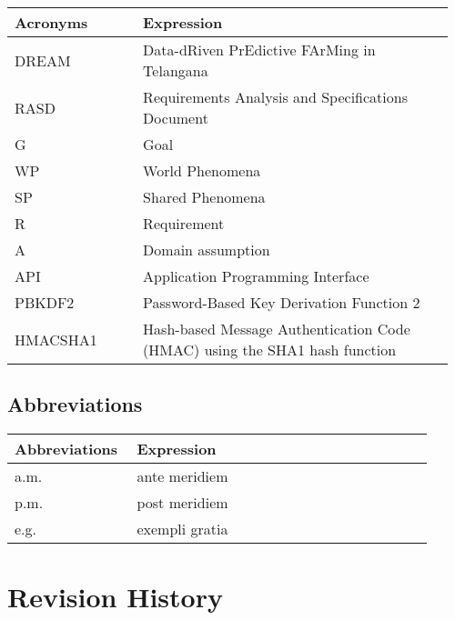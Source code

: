 \begin{center}
	\begin{longtable}{@{}p{0.28\linewidth} p{0.68\linewidth}@{}}
		\toprule
		\textbf{Acronyms}   & \textbf{Expression}\\
		\midrule
		DREAM               & Data-dRiven PrEdictive FArMing in Telangana\\
		RASD                & Requirements Analysis and Specifications Document\\
		G                   & Goal\\
		WP                  & World Phenomena\\
		SP                  & Shared Phenomena\\
		R                   & Requirement\\
		A                   & Domain assumption\\
		API                 & Application Programming Interface\\
		PBKDF2              & Password-Based Key Derivation Function 2 \\ 
		HMACSHA1            & Hash-based Message Authentication Code (HMAC) using the SHA1 hash function \\
		\bottomrule
	\end{longtable}
\end{center}

\subsection{Abbreviations}

\begin{center}
	\begin{longtable}{@{}p{0.28\linewidth} p{0.68\linewidth}@{}}
		\toprule
		\textbf{Abbreviations}  & \textbf{Expression}\\
		\midrule
	    a.m. & ante meridiem\\
	    p.m. & post meridiem\\
	    e.g. & exempli gratia\\
		\bottomrule
	\end{longtable}
\end{center}

\section{Revision History}

